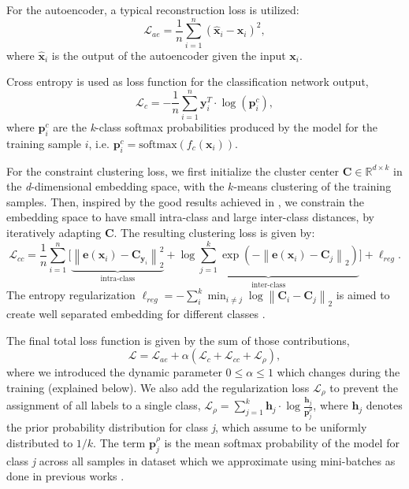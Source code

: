 \documentclass[runningheads, envcountsame, a4paper]{llncs}
\begin{document}
For the autoencoder, a typical reconstruction loss is utilized:
\begin{equation}
    \mathcal{L}_{ae} = \frac{1}{n} \sum_{i = 1}^{n} \left ( \bm{\hat{x}}_i - \bm{x}_i \right ) ^2 ,
\end{equation}
where $\bm{\hat{x}}_i$ is the output of the autoencoder given the input $\bm{x}_i$.

Cross entropy is used as loss function for the classification network output, 
\begin{equation}\label{eq:CE}
    \mathcal{L}_{c} = -\frac{1}{n} \sum_{i=1}^{n}  \bm{y}_{i}^T\cdot \log (\bm{p}^c_{i}),
\end{equation}
where $\bm{p}^c_i$ are the \textit{k}-class softmax probabilities produced by the model for the training sample $i$, i.e. $\bm{p}^c_i = \text{softmax}(f_c(\bm{x}_i))$.


For the constraint clustering loss, we first initialize the cluster center $\bm{C} \in \mathbb{R}^{d \times k}$ in the \textit{d}-dimensional embedding space, with the $k$-means clustering of the training samples.
Then, inspired by the good results achieved in \cite{zeghidour2020wavesplit}, we constrain the embedding space to have small intra-class and large inter-class distances, by iteratively adapting $\bm{C}$. 
The resulting clustering loss is given by:
\begin{equation}
    \mathcal{L}_{cc} = \frac{1}{n}\sum_{i=1}^{n} \Bigg[ {\underbrace{  \left \|\bm  e(\bm{x}_i) - \bm{C}_{\bm{y}_i} \right \| ^ 2 _2}_{\text{intra-class}}} + {\underbrace{\log \sum_{j=1}^{k} \exp \left ( - \left \|\bm e(\bm{x}_i) - \bm{C}_j \right \| _2 \right ) }_{\text{inter-class}}} \Bigg]  + \ell_{reg}.
\end{equation}
The entropy regularization $\ell_{reg} = - \sum_i^k \min_{i \neq j} \log \left \| \bm{C}_i - \bm{C}_j \right \|_2$ is aimed to create well separated embedding for different classes  \cite{sablayrolles2019spreading}.

The final total loss function is given by the sum of those contributions, 
\begin{equation}\label{eq:L}
    \mathcal{L} =   \mathcal{L}_{ae}  + \alpha \left( \mathcal{L}_{c} +  \mathcal{L}_{cc} +  \mathcal{L}_\rho \right),
\end{equation}
where we introduced the dynamic parameter $0\leq \alpha \leq 1$ which changes during the  training  (explained below).
We also add the regularization loss $\mathcal{L}_\rho$ to prevent the assignment of all labels to a single class, 
$   \mathcal{L}_\rho = \sum_{j=1}^k \bm{h}_j\cdot \log \frac{\bm{h}_j}{\bm{p}^\rho_{j}}
$,
where $\bm{h}_j$ denotes the prior probability distribution for class \textit{j}, which assume to be uniformly distributed to $1/k$. The term $\bm{p}^\rho_{j}$ is the mean softmax probability of the model for class \textit{j} across all samples in dataset which we  approximate using mini-batches as done in previous works \cite{arazo2019unsupervised}.
\end{document}
